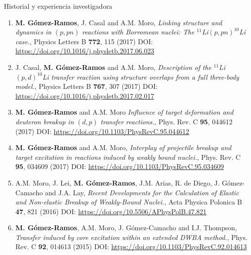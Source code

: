 \documentclass{resume2} %
\begin{document}
\begin{rSection}{Historial y experiencia investigadora}
\begin{enumerate}[label=\alph*.]
\begin{enumerate}[label=\arabic*.]
\item {\bf M. G\'omez-Ramos}, J. Casal and A.M. Moro, {\it Linking structure and dynamics in $(p,pn)$ reactions
with Borromean nuclei: The $^{11}$Li$(p,pn)^{10}$Li case.}, Physics Letters B {\bf 772}, 115 (2017) DOI: \url{https://doi.org/10.1016/j.physletb.2017.06.023}


\item J. Casal, {\bf M. G\'omez-Ramos} and A.M. Moro, {\it Description of the $^{11}$Li$(p,d)^{10}$Li transfer reaction using structure overlaps from a full three-body model.}, Physics Letters B {\bf 767}, 307 (2017) DOI: \url{https://doi.org/10.1016/j.physletb.2017.02.017}


\item {\bf M. G\'omez-Ramos} and A.M. Moro {\it Influence of target deformation and deuteron breakup in $(d, p)$ transfer reactions.}, Phys. Rev. C {\bf 95}, 044612 (2017) DOI: \url{https://doi.org/10.1103/PhysRevC.95.044612}


\item {\bf M. G\'omez-Ramos} and {A.M. Moro}, {\it Interplay of projectile breakup and target excitation in reactions induced by weakly bound nuclei.}, Phys. Rev. C {\bf 95}, 034609 (2017) DOI: \url{https://doi.org/10.1103/PhysRevC.95.034609}


\item A.M. Moro, J. Lei, {\bf M. G\'omez-Ramos}, J.M. Arias, R. de Diego, J. G\'omez-Camacho and J.A. Lay,
{\it Recent Developments for the Calculation of Elastic and Non-elastic Breakup of Weakly-Bound Nuclei.},
Acta Physica Polonica B {\bf 47}, 821 (2016) DOI: \url{https://doi.org/10.5506/APhysPolB.47.821}




\item {\bf M. G\'omez-Ramos}, A.M. Moro, J. G\'omez-Camacho and I.J. Thompson, {\it Transfer induced by core
excitation within an extended DWBA method.}, Phys. Rev. C {\bf 92}, 014613 (2015) DOI: \url{https://doi.org/10.1103/PhysRevC.92.014613}


\end{enumerate}
\end{enumerate}
\end{rSection}
\end{document}
